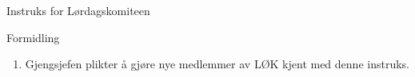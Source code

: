 \begin{instruks}{Instruks for Lørdagskomiteen}{ }{ }
    \begin{instruksledd}{Formidling}
        \begin{enumerate}
            \item Gjengsjefen plikter å gjøre nye medlemmer av LØK kjent med denne instruks.
        \end{enumerate}
    \end{instruksledd}

\end{instruks}


